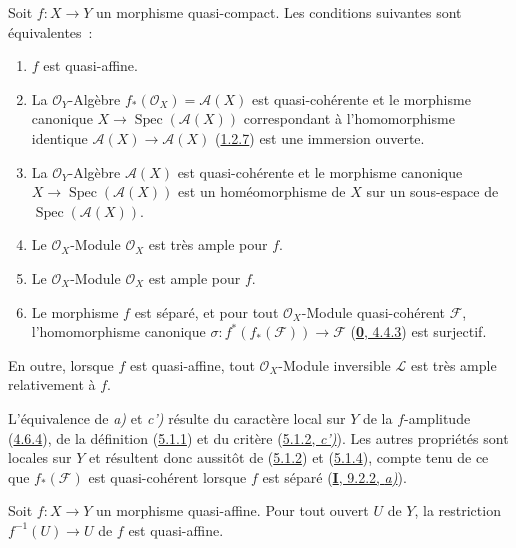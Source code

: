 \begin{proposition}[5.1.6]
\label{II.5.1.6-fr}
Soit $f:X\to Y$ un morphisme quasi-compact. Les conditions suivantes sont
équivalentes~:
\begin{enumerate}
  \item[\rm{a)}] $f$ est quasi-affine.
  \item[\rm{b)}] La $\mathcal{O}_Y$-Algèbre
  $f_*(\mathcal{O}_X)=\mathcal{A}(X)$ est quasi-cohérente et le morphisme
  canonique $X\to\operatorname{Spec}(\mathcal{A}(X))$ correspondant à
  l'homomorphisme identique $\mathcal{A}(X)\to\mathcal{A}(X)$
  \textup{(\hyperref[II.1.2.7-fr]{1.2.7})} est une immersion ouverte.
  \item[\rm{b')}] La $\mathcal{O}_Y$-Algèbre $\mathcal{A}(X)$ est
  quasi-cohérente et le morphisme canonique
  $X\to\operatorname{Spec}(\mathcal{A}(X))$ est un homéomorphisme de $X$
  sur un sous-espace de $\operatorname{Spec}(\mathcal{A}(X))$.
  \item[\rm{c)}] Le $\mathcal{O}_X$-Module $\mathcal{O}_X$ est très ample
  pour $f$.
  \item[\rm{c')}] Le $\mathcal{O}_X$-Module $\mathcal{O}_X$ est ample pour
  $f$.
  \item[\rm{d)}] Le morphisme $f$ est séparé, et pour tout
  $\mathcal{O}_X$-Module quasi-cohérent $\mathcal{F}$, l'homomorphisme
  canonique $\sigma:f^*(f_*(\mathcal{F}))\to\mathcal{F}$
  \textup{(\hyperref[0.4.4.3-fr]{\textbf{0}, 4.4.3})} est surjectif.
\end{enumerate}
En outre, lorsque $f$ est quasi-affine, tout $\mathcal{O}_X$-Module
inversible $\mathcal{L}$ est très ample relativement à $f$.
\end{proposition}

L'équivalence de \emph{a)} et \emph{c')} résulte du caractère local sur $Y$ de la
$f$-amplitude (\hyperref[II.4.6.4-fr]{4.6.4}), de la définition
(\hyperref[II.5.1.1-fr]{5.1.1}) et du critère
(\hyperref[II.5.1.2-fr]{5.1.2, \emph{c')}}). Les autres propriétés sont locales sur
$Y$
et résultent donc aussitôt de (\hyperref[II.5.1.2-fr]{5.1.2}) et
(\hyperref[II.5.1.4-fr]{5.1.4}), compte tenu de ce que
$f_*(\mathcal{F})$ est quasi-cohérent lorsque $f$ est séparé
(\hyperref[I.9.2.2-fr]{\textbf{I}, 9.2.2, \emph{a)}}).

\begin{corollary}[5.1.7]
\label{II.5.1.7-fr}
Soit $f:X\to Y$ un morphisme quasi-affine. Pour tout ouvert $U$ de $Y$, la
restriction $f^{-1}(U)\to U$ de $f$ est quasi-affine.
\end{corollary}

